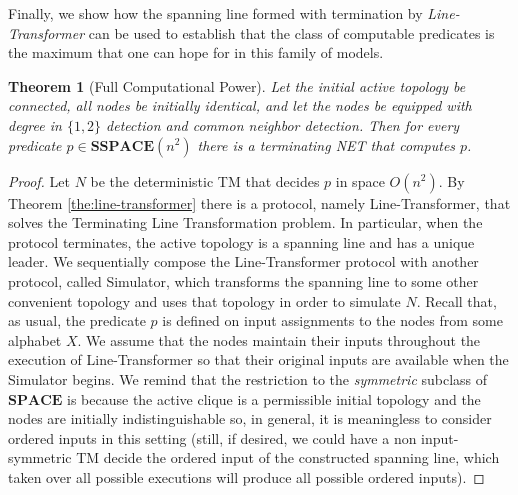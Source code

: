 \documentclass[preprint]{elsarticle}
\newcommand{\rem}{\mathbf}
\newtheorem{theorem}{Theorem}
\begin{document}
Finally, we show how the spanning line formed with termination by \emph{Line-Transformer} can be used to establish that the class of computable predicates is the maximum that one can hope for in this family of models.

\begin{theorem} [Full Computational Power]
Let the initial active topology be connected, all nodes be initially identical, and let the nodes be equipped with degree in $\{1,2\}$ detection and common neighbor detection. Then for every predicate $p\in\rem{SSPACE}(n^2)$ there is a terminating NET that computes $p$.  
\end{theorem}
\begin{proof}
Let $N$ be the deterministic TM that decides $p$ in space $O(n^2)$. By Theorem \ref{the:line-transformer} there is a protocol, namely Line-Transformer, that solves the Terminating Line Transformation problem. In particular, when the protocol terminates, the active topology is a spanning line and has a unique leader. We sequentially compose the Line-Transformer protocol with another protocol, called Simulator, which transforms the spanning line to some other convenient topology and uses that topology in order to simulate $N$. Recall that, as usual, the predicate $p$ is defined on input assignments to the nodes from some alphabet $X$. We assume that the nodes maintain their inputs throughout the execution of Line-Transformer so that their original inputs are available when the Simulator begins. We remind that the restriction to the \emph{symmetric} subclass of $\rem{SPACE}$ is because the active clique is a permissible initial topology and the nodes are initially indistinguishable so, in general, it is meaningless to consider ordered inputs in this setting (still, if desired, we could have a non input-symmetric TM decide the ordered input of the constructed spanning line, which taken over all possible executions will produce all possible ordered inputs).


\end{proof}
\end{document}
